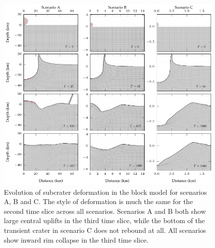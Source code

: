 \begin{figure}[!t]
\centering
\includegraphics[width=0.99\linewidth]{./images/block_deformation.pdf}
\caption{Evolution of subcrater deformation in the block model for scenarios A, B and C. The style of deformation is much the same for the second time slice across all scenarios. Scenarios A and B both show large central uplifts in the third time slice, while the bottom of the transient crater in scenario C does not rebound at all. All scenarios show inward rim collapse in the third time slice. \label{fig:block_deformation}}
\end{figure}


